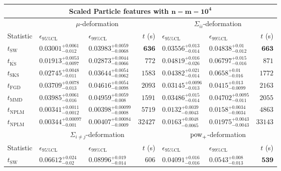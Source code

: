 \begin{tabular}{l|llr|llr}
	\toprule
	\multicolumn{7}{c}{{\bf Scaled Particle features with $\mathbf{n=m=10^{4}}$}} \\
	\toprule
	\multicolumn{1}{c}{} & \multicolumn{3}{c}{$\mu$-deformation} & \multicolumn{3}{c}{$\Sigma_{ii}$-deformation} \\
	Statistic & $\epsilon_{95\%\mathrm{CL}}$ & $\epsilon_{99\%\mathrm    {CL}}$ & $t$ (s) & $\epsilon_{95\%\mathrm{CL}}$ & $\epsilon_{99\%\mathrm{CL}}$ & $t$ (s) \\
	\midrule
	$t_{\mathrm{SW}}$ & $0.03001_{-0.012}^{+0.0061}$ & $0.03983_{-0.0068}^{+0.0059}$ & ${\mathbf{636}}$ & $0.03556_{-0.014}^{+0.013}$ & $0.04838_{-0.012}^{+0.01}$ & ${\mathbf{663}}$ \\
	$t_{\overline{\mathrm{KS}}}$ & ${\mathbf{0.01913_{-0.0097}^{+0.0053}}}$ & ${\mathbf{0.02873_{-0.0066}^{+0.0044}}}$ & $772$ & $0.04819_{-0.026}^{+0.016}$ & $0.06797_{-0.016}^{+0.015}$ & $871$ \\
	$t_{\mathrm{SKS}}$ & $0.02745_{-0.011}^{+0.0048}$ & $0.03644_{-0.0062}^{+0.0054}$ & $1583$ & $0.04382_{-0.014}^{+0.021}$ & $0.0658_{-0.016}^{+0.01}$ & $1772$ \\
	$t_{\mathrm{FGD}}$ & $0.03709_{-0.013}^{+0.0078}$ & $0.04616_{-0.0098}^{+0.0054}$ & $2093$ & ${\mathbf{0.03145_{-0.013}^{+0.0096}}}$ & ${\mathbf{0.0415_{-0.0099}^{+0.013}}}$ & $2163$ \\
	$t_{\mathrm{MMD}}$ & $0.03985_{-0.016}^{+0.0061}$ & $0.04959_{-0.008}^{+0.0059}$ & $1591$ & $0.03486_{-0.014}^{+0.015}$ & $0.04702_{-0.011}^{+0.0095}$ & $2055$ \\
\rowcolor{red!35}	$t_{\mathrm{NPLM}}$ & $0.00341_{-0.0012}^{+0.0011}$ & $0.00398_{-0.0008}^{+0.00099}$ & $5719$ & $0.0132_{-0.0043}^{+0.0039}$ & $0.0158_{-0.0034}^{+0.0034}$ & $4863$ \\
\rowcolor{blue!35}	$t_{\mathrm{NPLM}}$ & $0.00344_{-0.001}^{+0.00097}$ & $0.00407_{-0.0009}^{+0.00084}$ & $32427$ & $0.0163_{-0.0065}^{+0.0048}$ & $0.01975_{-0.0043}^{+0.0043}$ & $33143$ \\
	\toprule
	\multicolumn{1}{c}{} & \multicolumn{3}{c}{$\Sigma_{i\neq j}$-deformation} & \multicolumn{3}{c}{$\rm{pow}_{+}$-deformation} \\
Statistic & $\epsilon_{95\%\mathrm{CL}}$ & $\epsilon_{99\%\mathrm{CL}}$ & $t$ (s) & $\epsilon_{95\%\mathrm{CL}}$ & $\epsilon_{99\%\mathrm{CL}}$ & $t$ (s) \\
	\midrule
	$t_{\mathrm{SW}}$ & $0.06612_{-0.02}^{+0.024}$ & $0.08996_{-0.014}^{+0.019}$ & $606$ & $0.04091_{-0.016}^{+0.016}$ & $0.0543_{-0.013}^{+0.008}$ & ${\mathbf{539}}$ \\

\end{tabular}
